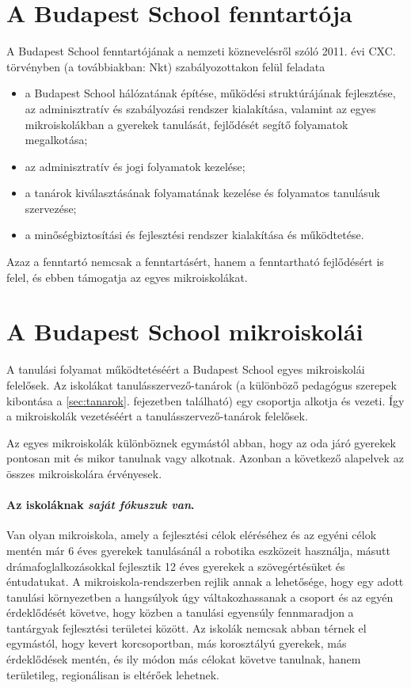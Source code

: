   \section{A Budapest School fenntartója}
  A Budapest School fenntartójának a nemzeti köznevelésről szóló 2011. évi CXC. törvényben (a továbbiakban: Nkt)  szabályozottakon felül feladata
  \begin{itemize}
  \item a Budapest School hálózatának építése, működési struktúrájának
  fejlesztése, az adminisztratív és szabályozási rendszer kialakítása,
  valamint az egyes mikroiskolákban a gyerekek tanulását, fejlődését segítő folyamatok megalkotása;
  \item  az adminisztratív és jogi folyamatok kezelése;
  \item  a tanárok kiválasztásának folyamatának kezelése és folyamatos tanulásuk szervezése;
  \item a minőségbiztosítási és fejlesztési rendszer kialakítása és működtetése.
\end{itemize}

 Azaz a fenntartó nemcsak a fenntartásért, hanem a fenntartható fejlődésért is felel, és ebben támogatja az egyes mikroiskolákat.

  \section{A Budapest School mikroiskolái}

  A tanulási folyamat működtetéséért a Budapest School egyes mikroiskolái
  felelősek. Az iskolákat tanulásszervező-tanárok (a különböző pedagógus szerepek kibontása a \ref{sec:tanarok}. fejezetben található) egy csoportja alkotja és vezeti. Így a
  mikroiskolák vezetéséért a tanulásszervező-tanárok felelősek.

  Az egyes mikroiskolák különböznek egymástól abban, hogy az oda járó gyerekek pontosan mit és mikor
  tanulnak vagy alkotnak. Azonban a következő alapelvek az összes mikroiskolára
  érvényesek.

\paragraph{Az iskoláknak \emph{saját fókuszuk van}.}

    Van olyan mikroiskola, amely a fejlesztési célok eléréséhez és az egyéni célok
    mentén már 6 éves gyerekek tanulásánál a robotika eszközeit használja,
    másutt drámafoglalkozásokkal fejlesztik 12 éves gyerekek a szövegértésüket és
    éntudatukat. A
    mikroiskola-rendszerben rejlik annak a lehetősége, hogy egy adott tanulási
    környezetben a hangsúlyok úgy váltakozhassanak a csoport és az egyén
    érdeklődését követve, hogy közben a tanulási egyensúly fennmaradjon a
    tantárgyak fejlesztési területei között. Az iskolák nemcsak abban térnek el
    egymástól, hogy kevert korcsoportban, más korosztályú gyerekek, más
    érdeklődések mentén, és ily módon más célokat követve tanulnak, hanem
    területileg, regionálisan is eltérőek lehetnek.


